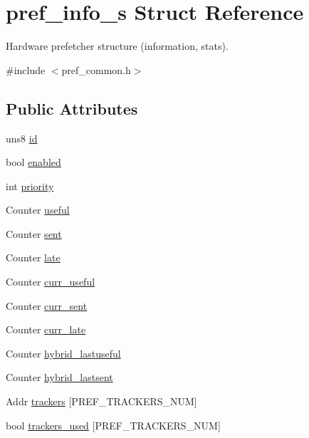 \hypertarget{structpref__info__s}{
\section{pref\_\-info\_\-s Struct Reference}
\label{structpref__info__s}
}


Hardware prefetcher structure (information, stats).  




{\ttfamily \#include $<$pref\_\-common.h$>$}

\subsection*{Public Attributes}
\begin{DoxyCompactItemize}
\item 
uns8 \hyperlink{structpref__info__s_aa751364dd397a33cd7ffdea42cbda8c0}{id}
\item 
bool \hyperlink{structpref__info__s_a76baaa162c64c556fad1f2f07cc11767}{enabled}
\item 
int \hyperlink{structpref__info__s_ad62caa3f68f6e5919b28dc207c46dfab}{priority}
\item 
Counter \hyperlink{structpref__info__s_a9b968c9aebf995d652f9f967eb7e5971}{useful}
\item 
Counter \hyperlink{structpref__info__s_a5c781e0f70693480da17b433e11d0132}{sent}
\item 
Counter \hyperlink{structpref__info__s_a2a55ea02b1cd31145a910e43a5ab74c0}{late}
\item 
Counter \hyperlink{structpref__info__s_ab196c66d3acfbe4309c4a6cc8fc565d5}{curr\_\-useful}
\item 
Counter \hyperlink{structpref__info__s_abc0afd16ea57472bdc0f79079cd3dc40}{curr\_\-sent}
\item 
Counter \hyperlink{structpref__info__s_ad21578ee3356e797bd0ebb5b3e61cbf5}{curr\_\-late}
\item 
Counter \hyperlink{structpref__info__s_a82eadd56d553c03fafdc8fa1349ee47d}{hybrid\_\-lastuseful}
\item 
Counter \hyperlink{structpref__info__s_a2e6f9ffea31a7a3dcb4b23d36b857dae}{hybrid\_\-lastsent}
\item 
Addr \hyperlink{structpref__info__s_a98609e4e7376f3fae20054c99feee11a}{trackers} \mbox{[}PREF\_\-TRACKERS\_\-NUM\mbox{]}
\item 
bool \hyperlink{structpref__info__s_a3c85c80bea8f5a3acbeb18316d8c912d}{trackers\_\-used} \mbox{[}PREF\_\-TRACKERS\_\-NUM\mbox{]}

\end{DoxyCompactItemize}
